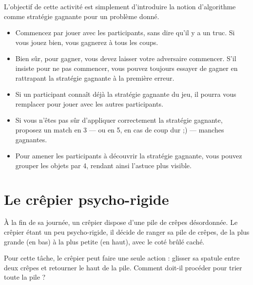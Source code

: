 \documentclass[a5paper,pagesize,DIV=14]{scrbook}
\begin{document}
L'objectif de cette activité est simplement d'introduire la notion d'algorithme
comme stratégie gagnante pour un problème donné.

\begin{itemize}
\item Commencez par jouer avec les participants, sans dire qu'il y a un truc. Si
  vous jouez bien, vous gagnerez à tous les coups.
\item Bien sûr, pour gagner, vous devez laisser votre adversaire commencer.
  S'il insiste pour ne pas commencer, vous pouvez toujours essayer de gagner en
  rattrapant la stratégie gagnante à la première erreur.
\item Si un participant connaît déjà la stratégie gagnante du jeu, il pourra
  vous remplacer pour jouer avec les autres participants.
\item Si vous n'êtes pas sûr d'appliquer correctement la stratégie gagnante,
  proposez un match en 3 --- ou en 5, en cas de coup dur ;) --- manches
  gagnantes.
\item Pour amener les participants à découvrir la stratégie gagnante, vous
  pouvez grouper les objets par 4, rendant ainsi l'astuce plus visible.
\end{itemize}
\chapter*{Le crêpier psycho-rigide}

À la fin de sa journée, un crêpier dispose d'une pile de crêpes désordonnée. Le
crêpier étant un peu psycho-rigide, il décide de ranger sa pile de crêpes, de la
plus grande (en bas) à la plus petite (en haut), avec le coté brûlé caché.

\begin{center}
  
\end{center}

Pour cette tâche, le crêpier peut faire une seule action : glisser sa spatule
entre deux crêpes et retourner le haut de la pile. Comment doit-il procéder pour
trier toute la pile ?

\begin{center}
  
\end{center}

\end{document}
